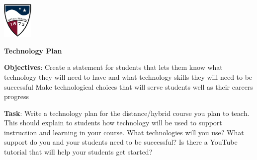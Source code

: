 \documentclass[10pt]{article}
\begin{document}
\pagestyle{empty}
\lstset{language=R, showspaces=false, showstringspaces=false}
\href{http://www.su.edu}{\includegraphics[height=1.75cm]{sulogo.eps}}
\vspace{-0.4in}

{\small \hfill
}
\setlength{\baselineskip}{1.05\baselineskip}


\begin{center}
\textbf{\large Technology Plan}
\end{center}\vspace{-5pt}

\textbf{Objectives}:
Create a statement for students that lets them know what technology they will need to have and what technology skills they will need to be successful
Make technological choices that will serve students well as their careers progress
\medskip

\textbf{Task}:
Write a technology plan for the distance/hybrid course you plan to teach.  This should explain to students how technology will be used to support instruction and learning in your course.  What technologies will you use?  What support do you and your students need to be successful?  Is there a YouTube tutorial that will help your students get started?
\medskip
\end{document}
